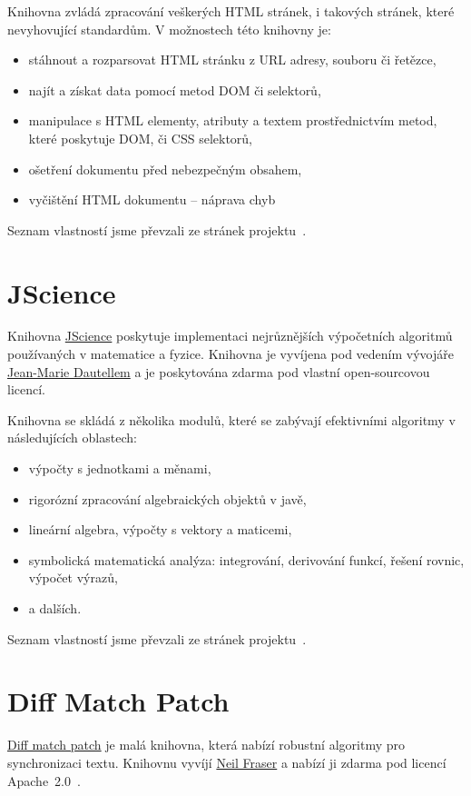 Knihovna zvládá zpracování veškerých HTML stránek, i takových stránek, které nevyhovující standardům.
V možnostech této knihovny je:
\begin{itemize}
	\item stáhnout a rozparsovat HTML stránku z URL adresy, souboru či řetězce,
	\item najít a získat data pomocí metod DOM či  selektorů,
	\item manipulace s HTML elementy, atributy a textem prostřednictvím metod, které poskytuje DOM, či CSS selektorů,
	\item ošetření dokumentu před nebezpečným obsahem,
	\item vyčištění HTML dokumentu -- náprava chyb
\end{itemize}
Seznam vlastností jsme převzali ze stránek projektu~\cite{jsoup}.

\section{JScience}
Knihovna \href{http://jscience.org/}{JScience} poskytuje implementaci nejrůznějších výpočetních algoritmů používaných v matematice a fyzice.
Knihovna je vyvíjena pod vedením vývojáře \href{mailto:jean-marie@dautelle.com}{Jean-Marie Dautellem} a je poskytována zdarma pod vlastní open-sourcovou licencí.

Knihovna se skládá z několika modulů, které se zabývají efektivními algoritmy v následujících oblastech:
\begin{itemize}
	\item výpočty s jednotkami a měnami,
	\item rigorózní zpracování algebraických objektů v javě,
	\item lineární algebra, výpočty s vektory a maticemi,
	\item symbolická matematická analýza: integrování, derivování funkcí, řešení rovnic, výpočet výrazů,
	\item a dalších.
\end{itemize}
Seznam vlastností jsme převzali ze stránek projektu~\cite{jscience}.

\section{Diff Match Patch}
\href{http://code.google.com/p/google-diff-match-patch/}{Diff match patch} je malá knihovna, která nabízí robustní algoritmy pro synchronizaci textu.
Knihovnu vyvíjí \href{mailto:root@neil.fraser.name}{Neil Fraser} a nabízí ji zdarma pod licencí Apache~2.0~\cite{apache20}.

